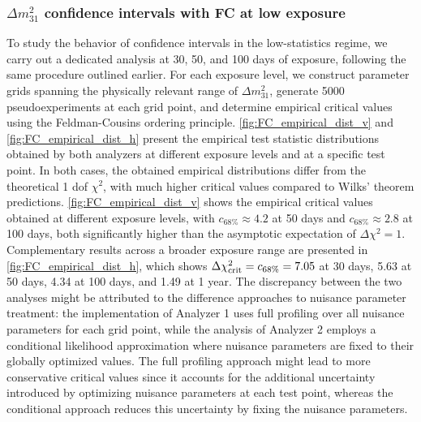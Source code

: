 \subsubsection{$\Delta m^2_{31}$ confidence intervals with FC at low exposure}
To study the behavior of confidence intervals in the low-statistics regime, we carry out a dedicated analysis at 30, 50, and 100 days of exposure, following the same procedure outlined earlier. For each exposure level, we construct parameter grids spanning the physically relevant range of $\Delta m_{31}^2$, generate 5000 pseudoexperiments at each grid point, and determine empirical critical values using the Feldman-Cousins ordering principle.
\autoref{fig:FC_empirical_dist_v} and \autoref{fig:FC_empirical_dist_h} present the empirical test statistic distributions obtained by both analyzers at different exposure levels and at a specific test point.  In both cases, the obtained empirical distributions differ from the theoretical 1 dof $\chi^2$, with much higher critical values compared to Wilks' theorem predictions. \autoref{fig:FC_empirical_dist_v} shows the empirical critical values obtained at different exposure levels, with $c_{68\%} \approx 4.2$ at 50 days and $c_{68\%} \approx 2.8$ at 100 days, both significantly higher than the asymptotic expectation of $\Delta \chi^2 = 1$. Complementary results across a broader exposure range are presented in \autoref{fig:FC_empirical_dist_h}, which shows $\Delta \chi^2_{\text{\rm crit}} = c_{68\%} = 7.05$ at 30 days, 5.63 at 50 days, 4.34 at 100 days, and 1.49 at 1 year.
The discrepancy between the two analyses might be attributed to the difference approaches to nuisance parameter treatment: the implementation of Analyzer 1 uses full profiling over all nuisance parameters for each grid point, while the analysis of Analyzer 2 employs a conditional likelihood approximation where nuisance parameters are fixed to their globally optimized values. The full profiling approach might lead to more conservative critical values since it accounts for the additional uncertainty introduced by optimizing nuisance parameters at each test point, whereas the conditional approach reduces this uncertainty by fixing the nuisance parameters. 


